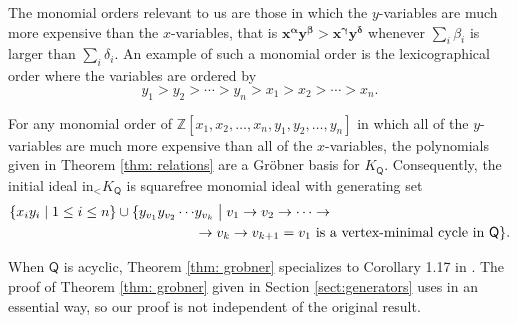 \documentclass[ALCO,published]{cedram}
\numberwithin{equation}{section}
\newcommand{\st}{\bigm\vert}
\newcommand{\1}{^{-1}}
\def\ZZ{\mathbb{Z}}
\def\Q{\mathsf{Q}}
\begin{document}
The monomial orders relevant to us are those in which the $y$-variables are much more expensive than the $x$-variables, that is $\mathbf{x}^{\mathbf{\alpha}}\mathbf{y}^{\mathbf{\beta}}> \mathbf{x}^{\mathbf{\gamma}}\mathbf{y}^{\mathbf{\delta}}$ whenever $\sum_i \beta_i$ is larger than $\sum_i \delta_i$.
An example of such a monomial order is the lexicographical order where the variables are ordered by
\[
y_1>y_2>\cdots>y_n>x_1>x_2>\cdots>x_n.
\]


\begin{thm}\label{thm: grobner}
For any monomial order of $\ZZ[x_1,x_2,\dots,x_n,y_1,y_2,\dots,y_n]$ in which all of the $y$-variables are much more expensive than all of the $x$-variables, the polynomials given in Theorem \ref{thm: relations} are a Gr\"obner basis for $K_\Q$. Consequently, the initial ideal $\text{in}_< K_\Q$ is squarefree monomial ideal with generating set
\begin{align*}
\{x_iy_i \mid 1\leq i\leq n\}\cup \{ y_{v_1}y_{v_2}\cdots &y_{v_k}\st v_1\rightarrow v_2\rightarrow \cdots \rightarrow\\
&\rightarrow v_k\rightarrow v_{k+1} = v_1  \textrm{ is a vertex-minimal cycle in }\Q\}.
\end{align*}
\end{thm}

\begin{rem}
When $\Q$ is acyclic, Theorem \ref{thm: grobner} specializes to Corollary 1.17 in \cite{BFZ05}.  The proof of Theorem \ref{thm: grobner} given in Section \ref{sect:generators} uses \cite[Corollary 1.17]{BFZ05} in an essential way, so our proof is not independent of the original result.
%
\end{rem}
\end{document}
